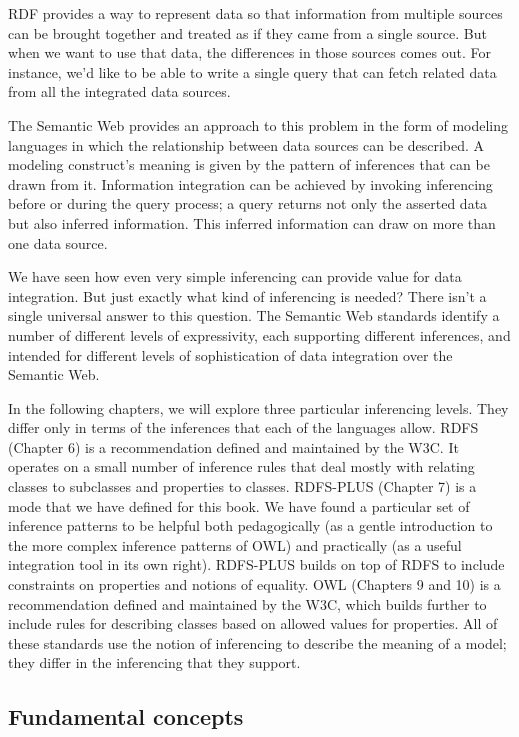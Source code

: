 RDF provides a way to represent data so that information from multiple
sources can be brought together and treated as if they came from a
single source. But when we want to use that data, the differences in
those sources comes out. For instance, we'd like to be able to write a
single query that can fetch related data from all the integrated data
sources.

The Semantic Web provides an approach to this problem in the form of
modeling languages in which the relationship between data sources can be
described. A modeling construct's meaning is given by the pattern of
inferences that can be drawn from it. Information integration can be
achieved by invoking inferencing before or during the query process; a
query returns not only the asserted data but also inferred information.
This inferred information can draw on more than one data source.

We have seen how even very simple inferencing can provide value for data
integration. But just exactly what kind of inferencing is needed? There
isn't a single universal answer to this question. The
Semantic Web standards identify a number of different levels of
expressivity, each supporting different inferences, and intended for
different levels of sophistication of data integration over the Semantic
Web.

In the following chapters, we will explore three particular inferencing
levels. They differ only in terms of the inferences that each of the
languages allow. RDFS (Chapter 6) is a recommendation defined and
maintained by the W3C. It operates on a small number of inference rules
that deal mostly with relating classes to subclasses and properties to
classes. RDFS-PLUS (Chapter 7) is a mode that we have defined for this
book. We have found a particular set of inference patterns to be helpful
both pedagogically (as a gentle introduction to the more complex
inference patterns of OWL) and practically (as a useful integration tool
in its own right). RDFS-PLUS builds on top of RDFS to include
constraints on properties and notions of equality. OWL (Chapters 9 and
10) is a recommendation defined and maintained by the W3C, which builds
further to include rules for describing classes based on allowed values
for properties. All of these standards use the notion of inferencing to
describe the meaning of a model; they differ in the inferencing that
they support.

\subsection{Fundamental concepts}

